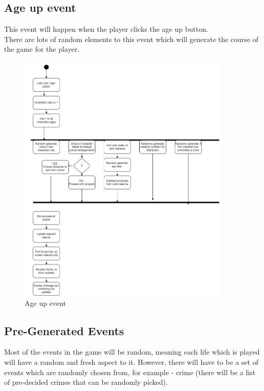 \subsection{Age up event}
This event will happen when the player clicks the age up button.\\
There are lots of random elements to this event which will generate the course of the game for the player.
\begin{figure}[H]
    \centering
    \includegraphics[width=0.9\textwidth]{images/design/ageUpEvent.png}
    \caption{Age up event}
    \label{fig:design-ageUpEvent}
\end{figure}

\subsection{Pre-Generated Events}
Most of the events in the game will be random, meaning each life which is played will have a random and fresh aspect to it. However, there will have to be a set of events which are randomly chosen from,  for example - crime (there will be a list of pre-decided crimes that can be randomly picked).


